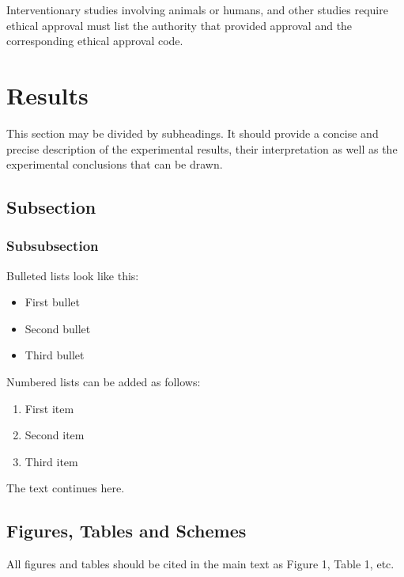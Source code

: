 \documentclass[bioengineering,article,submit,moreauthors,pdftex,10pt,a4paper]{mdpi}
\begin{document}
Interventionary studies involving animals or humans, and other studies require ethical approval must list the authority that provided approval and the corresponding ethical approval code. 
 
 
\section{Results}

This section may be divided by subheadings. It should provide a concise and precise description of the experimental results, their interpretation as well as the experimental conclusions that can be drawn.


\subsection{Subsection}

\subsubsection{Subsubsection}

Bulleted lists look like this:
\begin{itemize}[leftmargin=*,labelsep=5.8mm]
\item	First bullet
\item	Second bullet
\item	Third bullet
\end{itemize}

Numbered lists can be added as follows:
\begin{enumerate}[leftmargin=*,labelsep=4.9mm]
\item	First item 
\item	Second item
\item	Third item
\end{enumerate}

The text continues here.

\subsection{Figures, Tables and Schemes}

All figures and tables should be cited in the main text as Figure 1, Table 1, etc.
\end{document}
